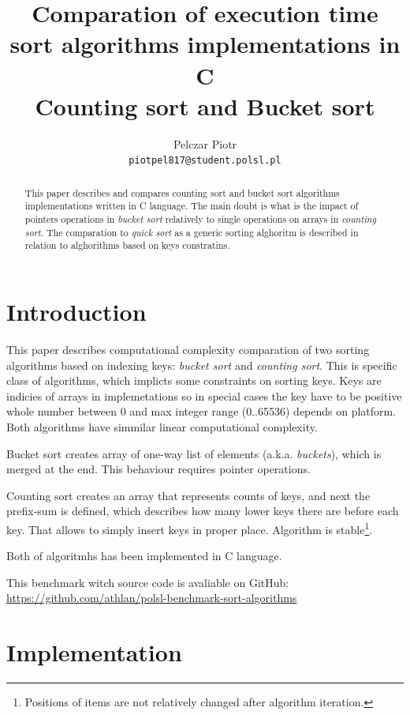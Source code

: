 \documentclass[12pt]{article}
\title{Comparation of execution time sort algorithms implementations in C\\
Counting sort and Bucket sort}
\author{
	  Pelczar Piotr\\
	  \small{\texttt{piotpel817@student.polsl.pl}}
	}
\date{\displaydate{date}}
\begin{document}
\maketitle
 
\begin{abstract}
This paper describes and compares counting sort and bucket sort algorithms implementations written in C language.
The main doubt is what is the impact of pointers operations in \emph{bucket sort} relatively to single operations on arrays
in \emph{counting sort}. The comparation to \emph{quick sort} as a generic sorting alghoritm is described in relation to alghorithms based on keys constratins.
\end{abstract}

\renewcommand{\contentsname}{Contents}

\newpage
\tableofcontents

\newpage
\section{Introduction}
\label{sec:intro}

This paper describes computational complexity comparation of two sorting algorithms based on indexing keys: \emph{bucket sort} and \emph{counting sort}. This is specific class of algorithms, which implicts some constraints on sorting keys. Keys are indicies of arrays in implemetations so in special cases the key have to be positive whole number between 0 and max integer range (0..65536) depends on platform. Both algorithms have simmilar linear computational complexity.

Bucket sort creates array of one-way list of elements (a.k.a. \emph{buckets}), which is merged at the end. This behaviour requires pointer operations\cite{cormen}.

Counting sort creates an array that represents counts of keys, and next the prefix-sum is defined, which describes how many lower keys there are before each key\cite{cormen}. That allows to simply insert keys in proper place. Algorithm is stable\footnote{Positions of items are not relatively changed after algorithm iteration.}.

Both of algoritmhs has been implemented in C language.

This benchmark witch source code is avaliable on GitHub:\\
\url{https://github.com/athlan/polsl-benchmark-sort-algorithms}

\section{Implementation}
\end{document}
